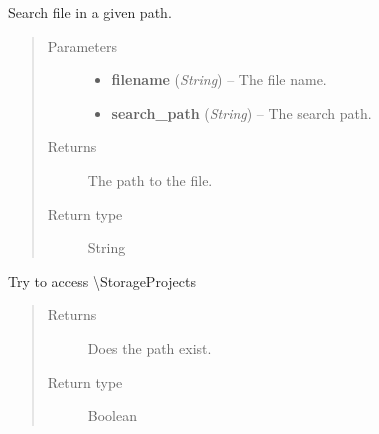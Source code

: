 \documentclass[letterpaper,10pt,english]{sphinxmanual}
\begin{document}
\begin{fulllineitems}
\label{filesystem:filesystem.search_file}
Search file in a given path.
\begin{quote}\begin{description}
\item[{Parameters}] \leavevmode\begin{itemize}
\item {} 
\textbf{filename} (\emph{String}) -- The file name.

\item {} 
\textbf{search\_path} (\emph{String}) -- The search path.

\end{itemize}

\item[{Returns}] \leavevmode
The path to the file.

\item[{Return type}] \leavevmode
String

\end{description}\end{quote}

\end{fulllineitems}


\begin{fulllineitems}
\label{filesystem:filesystem.test_storage_connection}
Try to access \textbackslash{}StorageProjects
\begin{quote}\begin{description}
\item[{Returns}] \leavevmode
Does the path exist.

\item[{Return type}] \leavevmode
Boolean

\end{description}\end{quote}

\end{fulllineitems}
\end{document}
